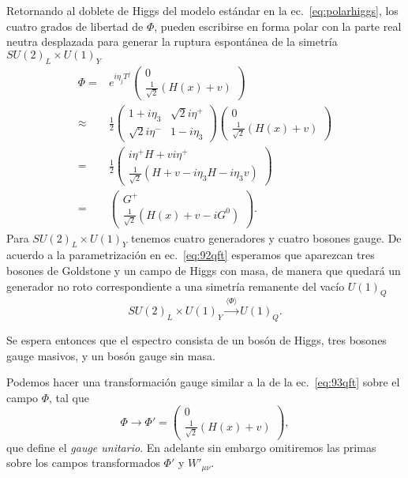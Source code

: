 \begin{frame}
Retornando al doblete de Higgs del modelo estándar en la ec.~\eqref{eq:polarhiggs}, los cuatro grados de libertad de $\Phi$, pueden escribirse en forma polar con la parte real neutra desplazada para generar la ruptura espontánea de la simetría $SU(2)_L\times  U(1)_Y$
\begin{align}
\label{eq:92qft}
  \Phi=&e^{i\eta_jT^j}
  \begin{pmatrix}
    0\\
    \frac{1}{\sqrt{2}}(H(x)+v)
  \end{pmatrix}\\
  \approx&
  \frac{1}{2}\begin{pmatrix}
    1+i\eta_3&\sqrt{2}i\eta^+\\
    \sqrt{2}i\eta^-&1-i\eta_3
  \end{pmatrix}  \begin{pmatrix}
    0\\
    \frac{1}{\sqrt{2}}(H(x)+v)
  \end{pmatrix}\nonumber\\
  =&\frac{1}{2}\begin{pmatrix}
    i\eta^+H+vi\eta^+\\
    \frac{1}{\sqrt{2}}(H+v-i\eta_3H-i\eta_3 v)
  \end{pmatrix}\nonumber\\
  =&\begin{pmatrix}
    G^+\\
    \frac{1}{\sqrt{2}}(H(x)+v-iG^0)
  \end{pmatrix}.\nonumber
\end{align}
Para $SU(2)_L\times  U(1)_Y$ tenemos cuatro generadores y cuatro bosones gauge. De acuerdo a la parametrización en ec.~\eqref{eq:92qft} esperamos que aparezcan tres bosones de Goldstone y un campo de Higgs con masa, de manera que quedará un generador no roto correspondiente a una simetría remanente del vacío $U(1)_Q$
\begin{equation}
  SU(2)_L\times  U(1)_Y\overset{\langle\Phi\rangle}{\longrightarrow}U(1)_Q.
\end{equation}

Se espera entonces que el espectro consista de un bosón de Higgs, tres bosones gauge masivos, y un bosón gauge sin masa.

Podemos hacer una transformación gauge similar a la de la 
ec.~\eqref{eq:93qft} sobre el campo $\Phi$, tal que
\begin{equation}
  \label{eq:123qft}
    \Phi\to\Phi'=
  \begin{pmatrix}
    0\\
    \frac{1}{\sqrt{2}}(H(x)+v)
  \end{pmatrix},
\end{equation}
que define el \emph{gauge unitario}. En adelante sin embargo omitiremos las primas sobre los campos transformados $\Phi'$ y $W'_{\mu\nu}$.


\end{frame}
